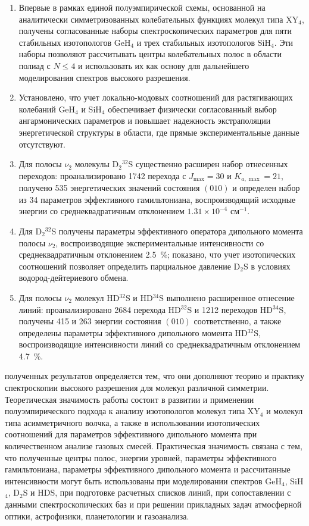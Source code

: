 {\novelty}
\begin{enumerate}[beginpenalty=10000]
  \item Впервые в рамках единой полуэмпирической схемы, основанной на аналитически симметризованных
  колебательных функциях молекул типа XY$_4$, получены согласованные наборы спектроскопических
  параметров для пяти стабильных изотопологов GeH$_4$ и трех стабильных изотопологов SiH$_4$. Эти наборы
  позволяют рассчитывать центры колебательных полос в области полиад с $N\leq4$ и использовать их как
  основу для дальнейшего моделирования спектров высокого разрешения.
  \item Установлено, что учет локально-модовых соотношений для растягивающих колебаний GeH$_4$ и SiH$_4$
  обеспечивает физически согласованный выбор ангармонических параметров и повышает надежность
  экстраполяции энергетической структуры в области, где прямые экспериментальные данные отсутствуют.
  \item Для полосы $\nu_2$ молекулы D$_2{}^{32}$S существенно расширен набор отнесенных переходов:
  проанализировано 1742 перехода с $J_{\max}=30$ и $K_{a,\max}=21$, получено 535 энергетических значений
  состояния $(010)$ и определен набор из 34 параметров эффективного гамильтониана, воспроизводящий
  исходные энергии со среднеквадратичным отклонением $1.31\times10^{-4}$ см$^{-1}$.
  \item Для D$_2{}^{32}$S получены параметры эффективного оператора дипольного момента полосы $\nu_2$,
  воспроизводящие экспериментальные интенсивности со среднеквадратичным отклонением 2.5~\%; показано,
  что учет изотопических соотношений позволяет определить парциальное давление D$_2$S в условиях
  водород-дейтериевого обмена.
  \item Для полосы $\nu_2$ молекул HD$^{32}$S и HD$^{34}$S выполнено расширенное отнесение линий:
  проанализировано 2684 перехода HD$^{32}$S и 1212 переходов HD$^{34}$S, получены 415 и 263 энергии
  состояния $(010)$ соответственно, а также определены параметры эффективного дипольного момента
  HD$^{32}$S, воспроизводящие интенсивности линий со среднеквадратичным отклонением 4.7~\%.
\end{enumerate}

{\influence} полученных результатов определяется тем, что они дополняют теорию и практику
спектроскопии высокого разрешения для молекул различной симметрии. Теоретическая значимость работы
состоит в развитии и применении полуэмпирического подхода к анализу изотопологов молекул типа XY$_4$ и
молекул типа асимметричного волчка, а также в использовании изотопических соотношений для параметров
эффективного дипольного момента при количественном анализе газовых смесей. Практическая значимость
связана с тем, что полученные центры полос, энергии уровней, параметры эффективного гамильтониана,
параметры эффективного дипольного момента и рассчитанные интенсивности могут быть использованы при
моделировании спектров GeH$_4$, SiH$_4$, D$_2$S и HDS, при подготовке расчетных списков линий, при
сопоставлении с данными спектроскопических баз и при решении прикладных задач атмосферной оптики,
астрофизики, планетологии и газоанализа.

